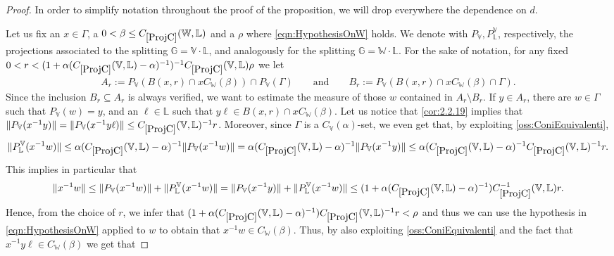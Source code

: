\documentclass[10pt, a4paper,
oneside, headinclude,footinclude]{scrartcl}
\begin{document}
\begin{proof}
In order to simplify notation throughout the proof of the proposition, we will drop everywhere the dependence on $d$.

Let us fix an $x\in \Gamma$, a $0<\beta\leq \oldC{ProjC}(\mathbb W,\mathbb L)$ and a $\rho$ where \eqref{eqn:HypothesisOnW} holds. We denote with $ P_\mathbb V,P_\mathbb L^{\mathbb V}$, respectively, the projections associated to the splitting $\mathbb G=\mathbb V\cdot\mathbb L$, and analogously for the splitting $\mathbb G=\mathbb W\cdot\mathbb L$. For the sake of notation, for any fixed $0<r<(1+\alpha(\oldC{ProjC}(\mathbb V,\mathbb L)-\alpha)^{-1})^{-1}\oldC{ProjC}(\mathbb V,\mathbb L)\rho$ we let
\begin{equation}
    \begin{split}
        A_r:=P_{\mathbb V}(B(x,r)\cap xC_{\mathbb W}(\beta))\cap P_{\mathbb V}(\Gamma)\qquad\text{and}\qquad
        B_r:=P_{\mathbb V}(B(x,r)\cap xC_{\mathbb W}(\beta)\cap \Gamma).
        \nonumber
    \end{split}
\end{equation}
Since the inclusion $B_r\subseteq A_r$ is always verified, we want to estimate the measure of those $w$ contained in $A_r\setminus B_r$. If $y\in A_r$, there are $w\in \Gamma$ such that $P_{\mathbb{V}}(w)=y$, and an $\ell\in\mathbb{L}$ such that $y\ell\in B(x,r)\cap xC_\mathbb{W}(\beta)$. Let us notice that \cref{cor:2.2.19} implies that $\|P_{\mathbb V}(x^{-1}y)\|=\|P_{\mathbb V}(x^{-1}y\ell)\|\leq \oldC{ProjC}(\mathbb V,\mathbb L)^{-1}r$. Moreover, since $\Gamma$ is a $C_{\mathbb V}(\alpha)$-set, we even get that, by exploiting \cref{oss:ConiEquivalenti},
$$\|P_{\mathbb L}^{\mathbb V}(x^{-1}w)\|\leq \alpha(\oldC{ProjC}(\mathbb V,\mathbb L)-\alpha)^{-1}\|P_{\mathbb V}(x^{-1}w)\|=\alpha(\oldC{ProjC}(\mathbb V,\mathbb L)-\alpha)^{-1}\|P_{\mathbb V}(x^{-1}y)\| \leq \alpha(\oldC{ProjC}(\mathbb V,\mathbb L)-\alpha)^{-1}\oldC{ProjC}(\mathbb V,\mathbb L)^{-1}r.$$
This implies in particular that
$$\|x^{-1}w\|\leq \|P_{\mathbb V}(x^{-1}w)\|+\|P_{\mathbb L}^{\mathbb V}(x^{-1}w)\|=\|P_{\mathbb V}(x^{-1}y)\|+\|P_{\mathbb L}^{\mathbb V}(x^{-1}w)\|\leq (1+\alpha(\oldC{ProjC}(\mathbb V,\mathbb L)-\alpha)^{-1})\oldC{ProjC}^{-1}(\mathbb V,\mathbb L)r.$$
Hence, from the choice of $r$, we infer that $(1+\alpha(\oldC{ProjC}(\mathbb V,\mathbb L)-\alpha)^{-1})\oldC{ProjC}(\mathbb V,\mathbb L)^{-1}r<\rho$ and thus  we can use the hypothesis in \eqref{eqn:HypothesisOnW} applied to $w$ to obtain that $x^{-1}w\in C_\mathbb W(\beta)$.
Thus, by also exploiting \cref{oss:ConiEquivalenti} and the fact that $x^{-1}y\ell\in C_\mathbb W(\beta)$ we get that

\end{proof}
\end{document}

